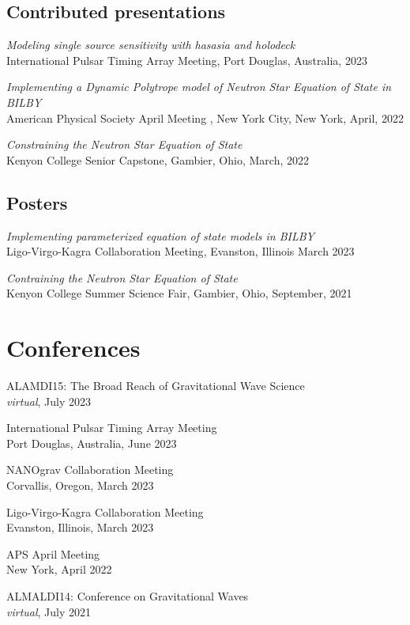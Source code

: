 \documentclass[11pt,letterpaper,sans,unicode]{moderncv}
\newcommand{\confitem}[3]{\item {#1}\\{#2}, #3}
\newcommand{\talkitem}[3]{\item \textit{#1}\\{#2}, #3} %
\begin{document}
\subsection{Contributed presentations}
\renewcommand\labelenumi{\bfseries\theenumi .}
\begin{etaremune}[leftmargin=8mm]
\small
\talkitem{Modeling single source sensitivity with hasasia and holodeck}{International Pulsar Timing Array Meeting}{Port Douglas, Australia, 2023}
\talkitem{Implementing a Dynamic Polytrope model of Neutron Star Equation of State in BILBY}{American Physical Society April Meeting }{New York City, New York, April, 2022}
\talkitem{Constraining the Neutron Star Equation of State}{Kenyon College Senior Capstone}{Gambier, Ohio, March, 2022}



\end{etaremune}
\subsection{Posters}
\begin{etaremune}[leftmargin=8mm]
\small
\talkitem{Implementing parameterized equation of state models in BILBY}{Ligo-Virgo-Kagra Collaboration Meeting}{Evanston, Illinois March 2023}
\talkitem{Contraining the Neutron Star Equation of State}{Kenyon College Summer Science Fair}{Gambier, Ohio, September, 2021}
\end{etaremune}



\section{Conferences}
\begin{etaremune}[leftmargin=8mm]
    \confitem{ALAMDI15: The Broad Reach of Gravitational Wave Science}{\textit{virtual}}{July 2023}
    \confitem{International Pulsar Timing Array Meeting}{Port Douglas, Australia}{June 2023}
    \confitem{NANOgrav Collaboration Meeting}{Corvallis, Oregon}{March 2023}
    \confitem{Ligo-Virgo-Kagra Collaboration Meeting}{Evanston, Illinois}{March 2023}
    \confitem{APS April Meeting}{New York}{April 2022}
    \confitem{ALMALDI14: Conference on Gravitational Waves}{\textit{virtual}}{July 2021}
\end{etaremune}
\end{document}
